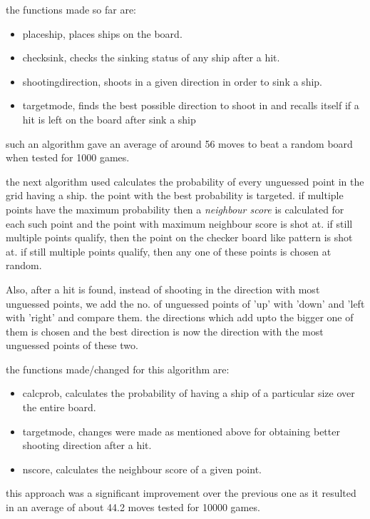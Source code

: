 \documentclass{article}
\begin{document}
	the functions made so far are:
	\begin{itemize}
   		
   		\item placeship, places ships on the board.
   		\item checksink, checks the sinking status of any ship after a hit.
   		\item shootingdirection, shoots in a given direction in order to sink a ship.
   		\item targetmode, finds the best possible direction to shoot in and recalls itself if a hit is left on the board after sink a ship
	
	\end{itemize}
	
	such an algorithm gave an average of around 56 moves to beat a random board when tested for 1000 games.
	
	the next algorithm used calculates the probability of every unguessed point in the grid having a ship. the point with the best probability is targeted. if multiple points have the maximum probability then a \textit{neighbour score} is calculated for each such point and the point with maximum neighbour score is shot at. if still multiple points qualify, then the point on the checker board like pattern is shot at. if still multiple points qualify, then any one of these points is chosen at random.
	
	Also, after a hit is found, instead of shooting in the direction with most unguessed points, we add the no. of unguessed points of 'up' with 'down' and 'left with 'right' and compare them. the directions which add upto the bigger one of them is chosen and the best direction is now the direction with the most unguessed points of these two.
	
	the functions made/changed for this algorithm are:
	\begin{itemize}
	
		\item calcprob, calculates the probability of having a ship of a particular size over the entire board.
		\item targetmode, changes were made as mentioned above for obtaining better shooting direction after a hit.
		\item nscore, calculates the neighbour score of a given point.
	\end{itemize}
	
	this approach was a significant improvement over the previous one as it resulted in an average of about 44.2 moves tested for 10000 games.
	
\end{document}
